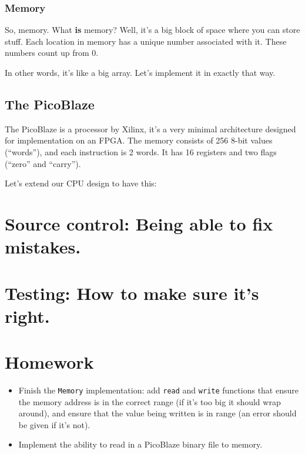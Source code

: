 \documentclass[12pt,a4paper]{article}
\begin{document}


\pagebreak
\subsubsection{Memory}

So, memory. What \textbf{is} memory? Well, it's a big block of space
where you can store stuff. Each location in memory has a unique number
associated with it. These numbers count up from 0.

In other words, it's like a big array. Let's implement it in exactly
that way.



\pagebreak
\subsection{The PicoBlaze}

The PicoBlaze is a processor by Xilinx, it's a very minimal
architecture designed for implementation on an FPGA. The memory
consists of 256 8-bit values (``words''), and each instruction is 2
words. It has 16 registers and two flags (``zero'' and ``carry'').

Let's extend our CPU design to have this:



\pagebreak
\section{Source control: Being able to fix mistakes.}

\pagebreak
\section{Testing: How to make sure it's right.}

\pagebreak
\section{Homework}

\begin{itemize}
  \item Finish the \texttt{Memory} implementation: add \texttt{read}
    and \texttt{write} functions that ensure the memory address is in
    the correct range (if it's too big it should wrap around), and
    ensure that the value being written is in range (an error should
    be given if it's not).

  \item Implement the ability to read in a PicoBlaze binary file to
    memory.
\end{itemize}
\end{document}
